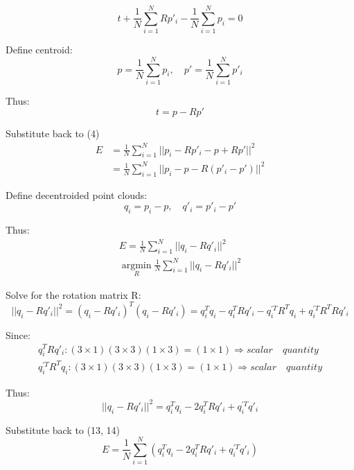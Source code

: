 \documentclass{article}
\begin{document}
\begin{equation}
t+\frac{1}{N}\sum^{N}_{i=1}Rp'_i - \frac{1}{N}\sum^{N}_{i=1}p_i=0
\end{equation}
\par
Define centroid:
\begin{equation}
p = \frac{1}{N}\sum_{i=1}^{N}p_i, \quad p' = \frac{1}{N}\sum_{i=1}^{N}p'_i
\end{equation}
\par
Thus:
\begin{equation}
t = p - Rp'
\end{equation}
\par
Substitute back to (4)
\begin{align}
E&=\frac{1}{N}\sum^{N}_{i=1}||p_i - Rp'_i -p+Rp'||^2\\
&=\frac{1}{N}\sum^{N}_{i=1}||p_i - p- R(p'_i -p')||^2
\end{align}
\par
Define decentroided point clouds:
\begin{equation}
q_i=p_i-p, \quad q'_i=p'_i-p'
\end{equation}
\par
Thus:
\begin{gather}
    E = \frac{1}{N}\sum^{N}_{i=1}||q_i - Rq'_i||^2\\
    \mathop{\arg\min}\limits_{R}\frac{1}{N}\sum^{N}_{i=1}||q_i - Rq'_i||^2
\end{gather}
\par
Solve for the rotation matrix R:
\begin{equation}
||q_i - Rq'_i||^2 = (q_i - Rq'_i)^T(q_i - Rq'_i) = q_i^Tq_i - q_i^TRq'_i - q_i^{\prime T}R^Tq_i + q_i^{\prime T}R^TRq'_i
\end{equation}
\par
Since:
\begin{gather}
    q_i^TRq'_i: (3 \times 1)(3 \times 3)(1 \times 3)=(1 \times 1) \Rightarrow scalar \quad quantity\\
    q_i^{\prime T}R^Tq_i: (3 \times 1)(3 \times 3)(1 \times 3)=(1 \times 1) \Rightarrow scalar \quad quantity
\end{gather}
\par
Thus:
\begin{equation}
    ||q_i - Rq'_i||^2 = q_i^Tq_i - 2q_i^TRq'_i + q_i^{\prime T}q'_i
\end{equation}
\par
Substitute back to (13, 14)
\begin{equation}
    E = \frac{1}{N}\sum^{N}_{i=1}(q_i^Tq_i - 2q_i^TRq'_i + q_i^{\prime T}q'_i)
\end{equation}
\end{document}
